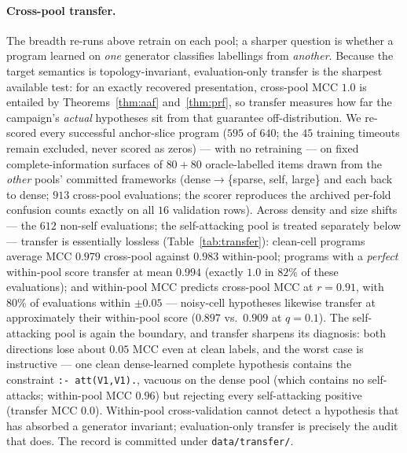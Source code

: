 \documentclass[review,12pt]{elsarticle}
\theoremstyle{definition}
\theoremstyle{remark}
\begin{document}
\paragraph{Cross-pool transfer.} The breadth re-runs above retrain on each
pool; a sharper question is whether a program learned on \emph{one} generator
classifies labellings from \emph{another}. Because the target semantics is
topology-invariant, evaluation-only transfer is the sharpest available test:
for an exactly recovered presentation, cross-pool MCC $1.0$ is entailed by
Theorems~\ref{thm:aaf} and~\ref{thm:prf}, so transfer measures how far the
campaign's \emph{actual} hypotheses sit from that guarantee off-distribution.
We re-scored every successful anchor-slice program ($595$ of $640$; the $45$
training timeouts remain excluded, never scored as zeros) --- with no
retraining --- on fixed complete-information surfaces of $80{+}80$
oracle-labelled items drawn from the \emph{other} pools' committed frameworks
(dense${}\to{}$\{sparse, self, large\} and each back to dense; $913$
cross-pool evaluations; the scorer reproduces the archived per-fold confusion
counts exactly on all $16$ validation rows). Across density and size shifts --- the $612$ non-self evaluations; the
self-attacking pool is treated separately below --- transfer is essentially
lossless (Table~\ref{tab:transfer}): clean-cell
programs average MCC $0.979$ cross-pool against $0.983$ within-pool; programs
with a \emph{perfect} within-pool score transfer at mean $0.994$ (exactly
$1.0$ in $82\%$ of these evaluations); and within-pool MCC predicts
cross-pool MCC at $r=0.91$, with $80\%$ of evaluations within $\pm 0.05$ ---
noisy-cell hypotheses likewise transfer at approximately their within-pool
score ($0.897$ vs.\ $0.909$ at $q{=}0.1$). The self-attacking pool is again the
boundary, and transfer sharpens its diagnosis: both directions lose about
$0.05$ MCC even at clean labels, and the worst case is instructive --- one
clean dense-learned complete hypothesis contains the constraint
\texttt{:- att(V1,V1).}, vacuous on the dense pool (which contains no
self-attacks; within-pool MCC $0.96$) but rejecting every self-attacking
positive (transfer MCC $0.0$). Within-pool cross-validation cannot detect a
hypothesis that has absorbed a generator invariant; evaluation-only transfer
is precisely the audit that does. The record is committed under
\texttt{data/transfer/}.
\end{document}
